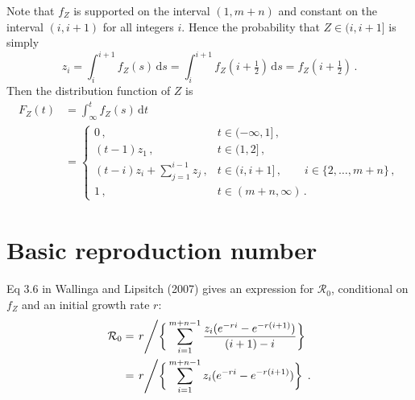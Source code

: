 \documentclass[12pt]{article}
\begin{document}
Note that $f_Z$ is supported on the interval $(1,m+n)$ and constant
on the interval $(i,i+1)$ for all integers $i$. Hence the probability
that $Z \in (i,i+1]$ is simply
%
\begin{equation}
    z_i = \int_{i}^{i+1} f_Z(s)\,\text{d}s = \int_{i}^{i+1} f_Z(i+\tfrac{1}{2})\,\text{d}s = f_Z(i+\tfrac{1}{2})\,.
\end{equation}
%
Then the distribution function of $Z$ is
%
\begin{equation}
  \begin{aligned}
    F_Z(t)
    &= \int_{\infty}^{t} f_Z(s)\,\text{d}t \\
    &= \begin{cases}
      0\,, & t \in (-\infty,1]\,, \\
      (t-1) z_1\,, & t \in (1,2]\,, \\
      (t-i) z_i + \sum_{j=1}^{i-1} z_j\,, & t \in (i,i+1]\,,\qquad i \in \{2,\ldots,m+n\}\,, \\
      1\,, & t \in (m+n,\infty)\,.
    \end{cases}
  \end{aligned}
\end{equation}

            
\section{Basic reproduction number}

Eq 3.6 in Wallinga and Lipsitch (2007) gives an expression for 
$\mathcal{R}_0$, conditional on $f_Z$ and an initial growth rate $r$:
%
\begin{equation}
  \begin{aligned}
    \mathcal{R}_0
    &= \left. r \middle/ \bigg\{\sum_{i=1}^{m+n-1} \frac{z_i (e^{-r i} - e^{-r (i+1)})}{(i+1) - i}\bigg\} \right. \\
    &= \left. r \middle/ \bigg\{\sum_{i=1}^{m+n-1} z_i (e^{-r i} - e^{-r (i+1)})\bigg\} \right.\,.
   \end{aligned}
\end{equation}
\end{document}
